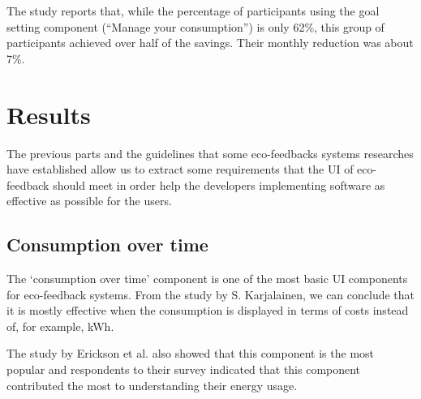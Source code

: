 \documentclass[journal]{vgtc}                %
\begin{document}
The study reports that, while the percentage of participants using the goal setting component (``Manage your consumption'') is only 62\%, this group of participants achieved over half of the savings. Their monthly reduction was about 7\%.

\section{Results}
The previous parts and the guidelines that some eco-feedbacks systems researches have established allow us to extract some requirements that the UI of eco-feedback should meet in order help the developers implementing software as effective as possible for the users. \\ %

%

\subsection{Consumption over time}
The `consumption over time' component is one of the most basic UI components for eco-feedback systems. From the study by S. Karjalainen, we can conclude that it is mostly effective when the consumption is displayed in terms of costs instead of, for example, kWh.

The study by Erickson et al. also showed that this component is the most popular and respondents to their survey indicated that this component contributed the most to understanding their energy usage.
\end{document}
